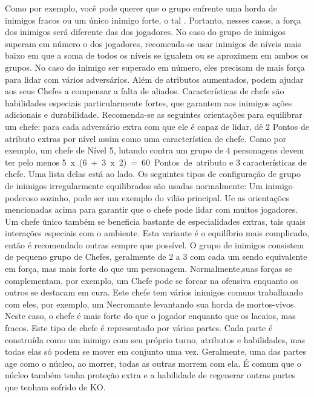 Como por exemplo, você pode querer que o grupo enfrente uma horda de inimigos fracos ou um único inimigo forte, o tal .
Portanto, nesses casos, a força dos inimigos será diferente das dos jogadores.
No caso do grupo de inimigos superam em número o dos jogadores, recomenda-se usar inimigos de níveis mais baixo em que a soma de todos os níveis se igualem ou se aproximem em ambos os grupos.
No caso do inimigo ser superado em número, eles precisam de mais força para lidar com vários adversários.
Além de atributos aumentados,  podem ajudar aos seus Chefes a compensar a falta de aliados.
Características de chefe são habilidades especiais particularmente fortes, que garantem aos inimigos ações adicionais e durabilidade.
Recomenda-se as seguintes orientações para equilibrar um chefe: para cada adversário extra com que ele é capaz de lidar, dê 2 Pontos de atributo extras por nível assim como uma característica de chefe.
Como por exemplo, um chefe de Nível 5, lutando contra um grupo de 4 personagens devem ter pelo menos \mbox{5 x (6 + 3 x 2) = 60 Pontos de atributo} e 3 características de chefe.
Uma lista delas está ao lado.
%
\vfill
%
Os seguintes tipos de configuração de grupo de inimigos irregularmente equilibrados são usadas normalmente:
\ofrow
{}
Um inimigo poderoso sozinho, pode ser um exemplo do vilão principal.
Ue as orientações mencionadas acima para garantir que o chefe pode lidar com muitos jogadores.
Um chefe único também se beneficia bastante de especialidades extras, tais quais interações especiais com o ambiente.
Esta variante é o equilíbrio mais complicado, então é recomendado outras sempre que possível.
\ofrow
{} 
O grupo de inimigos consistem de pequeno grupo de Chefes, geralmente de 2 a 3 com cada um sendo equivalente em força, mas mais forte do que um personagem.
Normalmente,suas forças se complementam, por exemplo, um Chefe pode se forcar na ofensiva enquanto os outros se destacam em cura.
\ofrow
{} 
Este chefe tem vários inimigos comuns trabalhando com eles, por exemplo, um Necromante levantando sua horda de mortos-vivos.
Neste caso, o chefe é mais forte do que o jogador enquanto que os lacaios, mas fracos.
\ofrow
{} 
Este tipo de chefe é representado por várias partes.
Cada parte é construída como um inimigo com seu próprio turno, atributos e habilidades, mas todas elas só podem se mover em conjunto uma vez.
Geralmente, uma das partes age como o núcleo, ao morrer, todas as outras morrem com ela.
É comum que o núcleo também tenha proteção extra e a habilidade de regenerar outras partes que tenham sofrido de KO.
